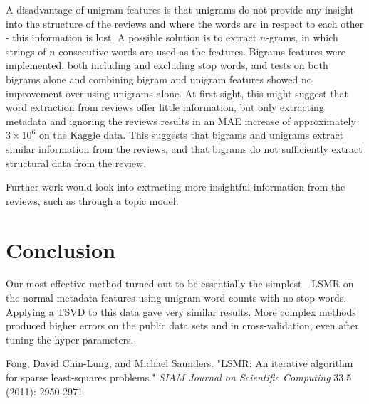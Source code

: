 \documentclass[11pt]{amsart}
\begin{document}
A disadvantage of unigram features is that unigrams do not provide any insight into the structure of the reviews and where the words are in respect to each other - this information is lost. A possible solution is to extract $n$-grams, in which strings of $n$ consecutive words are used as the features. Bigrams features were implemented, both including and excluding stop words, and tests on both bigrams alone and combining bigram and unigram features showed no improvement over using unigrams alone. At first sight, this might suggest that word extraction from reviews offer little information, but only extracting metadata and ignoring the reviews results in an MAE increase of approximately $3\times10^6$ on the Kaggle data. This suggests that bigrams and unigrams extract similar information from the reviews, and that bigrams do not sufficiently extract structural data from the review.

Further work would look into extracting more insightful information from the reviews, such as through a topic model.

\section{Conclusion}

Our most effective method turned out to be essentially the simplest---LSMR on the normal metadata features using unigram word counts with no stop words. Applying a TSVD to this data gave very similar results. More complex methods produced higher errors on the public data sets and in cross-validation, even after tuning the hyper parameters.

\begingroup
\begin{thebibliography}{9}

Fong, David Chin-Lung, and Michael Saunders. "LSMR: An iterative algorithm for sparse least-squares problems."
\emph{SIAM Journal on Scientific Computing} 33.5 (2011): 2950-2971

\end{thebibliography}
\endgroup
\end{document}
